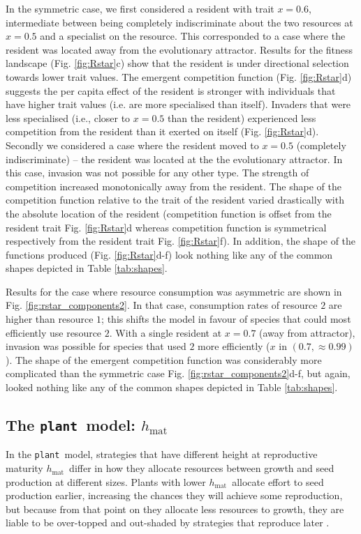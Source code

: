 \documentclass[a4paper,11pt]{article}
\newcommand{\plant}{{\tt plant}}
\newcommand{\hmat}{\ensuremath{h_{\text{mat}}}}
\begin{document}
In the symmetric case, we first considered a resident with trait $x = 0.6$, intermediate between being completely indiscriminate about the two resources at $x = 0.5$ and a specialist on the resource. This corresponded to a case where the resident was located away from the evolutionary attractor. Results for the fitness landscape (Fig. \ref{fig:Rstar}c) show that the resident is under directional selection towards lower trait values. The emergent competition function (Fig. \ref{fig:Rstar}d) suggests the per capita effect of the resident is stronger with individuals that have higher trait values (i.e. are more specialised than itself). Invaders that were less specialised (i.e., closer to $x = 0.5$ than the resident) experienced less competition from the resident than it exerted on itself (Fig. \ref{fig:Rstar}d). Secondly we considered a case where the resident moved to $x = 0.5$ (completely indiscriminate) -- the resident was located at the the evolutionary attractor.  In this case, invasion was not possible for any other type. The strength of competition increased monotonically away from the resident. The shape of the competition function relative to the trait of the resident varied drastically with the absolute location of the resident (competition function is offset from the resident trait Fig. \ref{fig:Rstar}d whereas competition function is symmetrical respectively from the resident trait Fig. \ref{fig:Rstar}f). In addition, the shape of the functions produced (Fig. \ref{fig:Rstar}d-f) look nothing like any of the common shapes depicted in Table \ref{tab:shapes}.

Results for the case where resource consumption was asymmetric are shown in Fig. \ref{fig:rstar_components2}. In that case, consumption rates of resource $2$ are higher than resource $1$; this shifts the model in favour of species that could most efficiently use resource $2$. With a single resident at $x = 0.7$ (away from attractor), invasion was possible for species that used $2$ more efficiently ($x$ in $(0.7, \approx 0.99)$). The shape of the emergent competition function was considerably more complicated than the symmetric case Fig. \ref{fig:rstar_components2}d-f, but again, looked nothing like any of the common shapes depicted in Table \ref{tab:shapes}.

\subsection{The \plant\ model: \hmat}

In the \plant\ model, strategies that have different height at reproductive maturity \hmat\ differ in how they allocate resources between growth and seed production at different sizes. Plants with lower \hmat\ allocate effort to seed production earlier, increasing the chances they will achieve some reproduction, but because from that point on they allocate less resources to growth, they are liable to be over-topped and out-shaded by strategies that reproduce later \cite{Falster-2017}.
\end{document}
